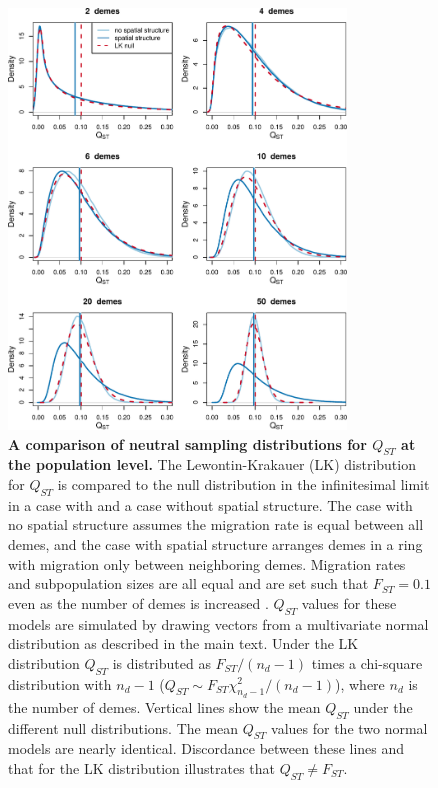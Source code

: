 \begin{figure}
  \centering
  \includegraphics[width=0.8\textwidth]{./figures/qst_deme_compare.pdf}
  \caption{ \textbf{A comparison of neutral sampling distributions for $Q_{ST}$
      at the population level.} The Lewontin-Krakauer (LK) distribution for
    $Q_{ST}$ is compared to the null distribution in the infinitesimal limit in
    a case with and a case without spatial structure. The case with no spatial
    structure assumes the migration rate is equal between all demes, and the
    case with spatial structure arranges demes in a ring with migration only
    between neighboring demes. Migration rates and subpopulation sizes are all
    equal and are set such that $F_{ST}=0.1$ even as the number of demes is
    increased \citep{Slatkin1991}. $Q_{ST}$ values for these models are
    simulated by drawing vectors from a multivariate normal distribution as
    described in the main text. Under the LK distribution $Q_{ST}$ is
    distributed as $F_{ST}/(n_d - 1)$ times a chi-square distribution with $n_d
    - 1$ ($Q_{ST}\sim F_{ST}\chi^2_{n_d - 1}/(n_d-1)$), where $n_d$ is the
    number of demes. Vertical lines show the mean $Q_{ST}$ under the different
    null distributions. The mean $Q_{ST}$ values for the two normal models are
    nearly identical. Discordance between these lines and that for the LK
    distribution illustrates that $Q_{ST} \neq F_{ST}$.}
  \label{fig:qst_deme}
\end{figure}

